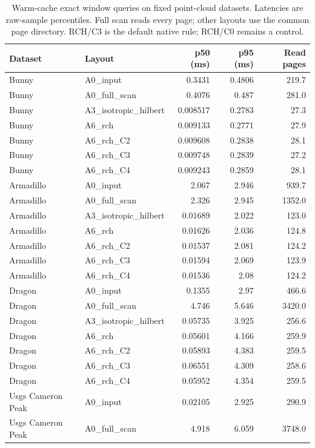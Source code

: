 \begin{table}[tbp]\centering\small
\caption{Warm-cache exact window queries on fixed point-cloud datasets. Latencies are raw-sample percentiles. Full scan reads every page; other layouts use the common page directory. RCH/C3 is the default native rule; RCH/C0 remains a control.}
\label{tab:application_query}
\begin{tabular}{llrrr}\toprule Dataset & Layout & p50 (ms) & p95 (ms) & Read pages \\ \midrule
Bunny & A0\_input & 0.3431 & 0.4806 & 219.7 \\
Bunny & A0\_full\_scan & 0.4076 & 0.487 & 281.0 \\
Bunny & A3\_isotropic\_hilbert & 0.008517 & 0.2783 & 27.3 \\
Bunny & A6\_rch & 0.009133 & 0.2771 & 27.9 \\
Bunny & A6\_rch\_C2 & 0.009608 & 0.2838 & 28.1 \\
Bunny & A6\_rch\_C3 & 0.009748 & 0.2839 & 27.2 \\
Bunny & A6\_rch\_C4 & 0.009243 & 0.2859 & 28.1 \\
Armadillo & A0\_input & 2.067 & 2.946 & 939.7 \\
Armadillo & A0\_full\_scan & 2.326 & 2.945 & 1352.0 \\
Armadillo & A3\_isotropic\_hilbert & 0.01689 & 2.022 & 123.0 \\
Armadillo & A6\_rch & 0.01626 & 2.036 & 124.8 \\
Armadillo & A6\_rch\_C2 & 0.01537 & 2.081 & 124.2 \\
Armadillo & A6\_rch\_C3 & 0.01594 & 2.069 & 123.9 \\
Armadillo & A6\_rch\_C4 & 0.01536 & 2.08 & 124.2 \\
Dragon & A0\_input & 0.1355 & 2.97 & 466.6 \\
Dragon & A0\_full\_scan & 4.746 & 5.646 & 3420.0 \\
Dragon & A3\_isotropic\_hilbert & 0.05735 & 3.925 & 256.6 \\
Dragon & A6\_rch & 0.05601 & 4.166 & 259.9 \\
Dragon & A6\_rch\_C2 & 0.05893 & 4.383 & 259.5 \\
Dragon & A6\_rch\_C3 & 0.06551 & 4.309 & 258.6 \\
Dragon & A6\_rch\_C4 & 0.05952 & 4.354 & 259.5 \\
Usgs Cameron Peak & A0\_input & 0.02105 & 2.925 & 290.9 \\
Usgs Cameron Peak & A0\_full\_scan & 4.918 & 6.059 & 3748.0 \\

\end{tabular}
\end{table}
